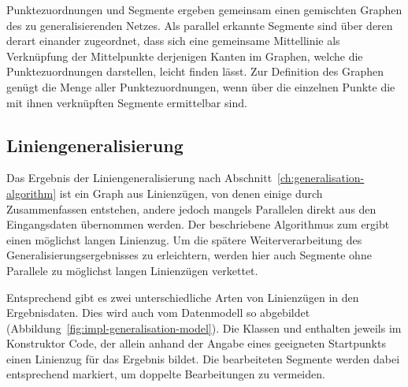 \documentclass[../main/thesis.tex]{subfiles}
\begin{document}
Punktezuordnungen und Segmente ergeben gemeinsam einen gemischten Graphen des zu generalisierenden Netzes.
Als parallel erkannte Segmente sind über deren  derart einander zugeordnet, dass sich eine gemeinsame Mittellinie als Verknüpfung der Mittelpunkte derjenigen Kanten im Graphen, welche die Punktezuordnungen darstellen, leicht finden lässt.
Zur Definition des Graphen genügt die Menge aller Punktezuordnungen, wenn über die einzelnen Punkte die mit ihnen verknüpften Segmente ermittelbar sind.




\subsection{Liniengeneralisierung}
\label{ch:impl-generalisation}

Das Ergebnis der Liniengeneralisierung nach Abschnitt~\ref{ch:generalisation-algorithm} ist ein Graph aus Linienzügen, von denen einige durch Zusammenfassen entstehen, andere jedoch mangels Parallelen direkt aus den Eingangsdaten übernommen werden.
Der beschriebene Algorithmus zum  ergibt einen möglichst langen Linienzug.
Um die spätere Weiterverarbeitung des Generalisierungsergebnisses zu erleichtern, werden hier auch Segmente ohne Parallele zu möglichst langen Linienzügen verkettet.


Entsprechend gibt es zwei unterschiedliche Arten von Linienzügen in den Ergebnisdaten.
Dies wird auch vom Datenmodell so abgebildet (Abbildung~\ref{fig:impl-generalisation-model}).
Die Klassen  und  enthalten jeweils im Konstruktor Code, der allein anhand der Angabe eines geeigneten Startpunkts einen Linienzug für das Ergebnis bildet.
Die bearbeiteten Segmente werden dabei entsprechend markiert, um doppelte Bearbeitungen zu vermeiden.
\end{document}

